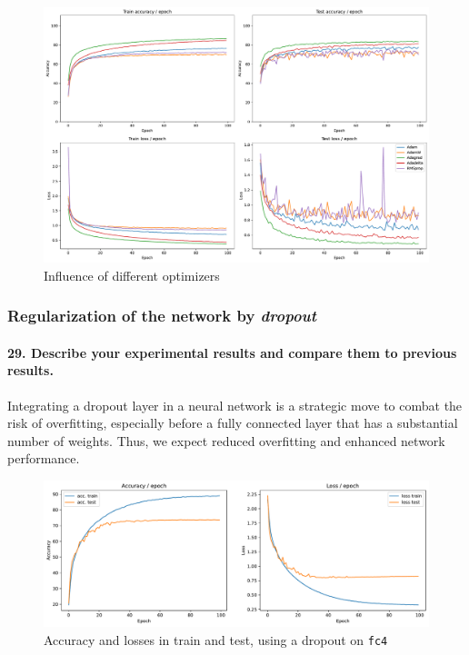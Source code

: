 \documentclass{article}
\theoremstyle{plain}%
\theoremstyle{definition}
\theoremstyle{remark}
\begin{document}
\begin{figure}[H]
    \centering
    \includegraphics*[width=\textwidth]{figs/CNN/optimizers_influence.pdf}
    \caption{Influence of different optimizers}
    \label{fig:optimizers_influence}
\end{figure}

\subsubsection{Regularization of the network by \textit{dropout}}
\paragraph{29. Describe your experimental results and compare them to previous results.}

Integrating a dropout layer in a neural network is a strategic move to combat the risk of overfitting, especially before a fully connected layer that has a substantial number of weights. Thus, we expect reduced overfitting and enhanced network performance.

\begin{figure}[H]
    \centering
    \includegraphics*[width=\textwidth]{figs/CNN/dropout.pdf}
    \caption{Accuracy and losses in train and test, using a dropout on \texttt{fc4}}
    \label{fig:dropout}
\end{figure}
\end{document}

